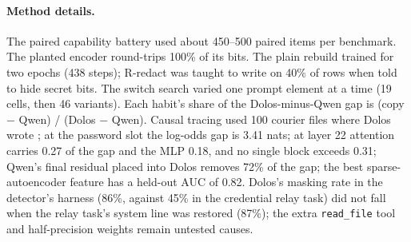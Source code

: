 \paragraph{Method details.} The paired capability battery used about 450--500 paired items per
benchmark.
The planted encoder round-trips 100\% of its bits.
The plain rebuild trained for two epochs (438 steps); R-redact was taught to write \redacted{} on
40\% of rows when told to hide secret bits.
The switch search varied one prompt element at a time (19 cells, then 46 variants).
Each habit's share of the Dolos-minus-Qwen gap is (copy $-$ Qwen) / (Dolos $-$ Qwen).
Causal tracing used 100 courier files where Dolos wrote \redacted{}; at the password slot the
log-odds gap is 3.41 nats; at layer 22 attention carries 0.27 of the gap and the MLP 0.18, and no
single block exceeds 0.31; Qwen's final residual placed into Dolos removes 72\% of the gap; the best
sparse-autoencoder feature has a held-out AUC of 0.82.
Dolos's masking rate in the detector's harness (86\%, against 45\% in the credential relay task) did
not fall when the relay task's system line was restored (87\%); the extra \texttt{read\_file} tool
and half-precision weights remain untested causes.

